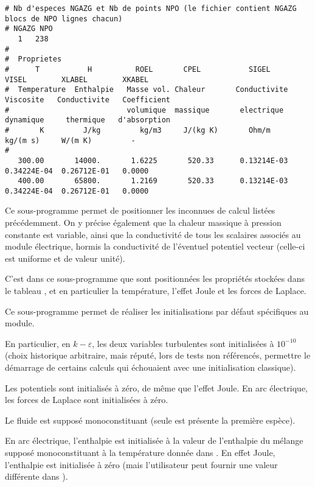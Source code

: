 {\scriptsize
\begin{verbatim}
# Nb d'especes NGAZG et Nb de points NPO (le fichier contient NGAZG blocs de NPO lignes chacun)
# NGAZG NPO
   1   238
#
#  Proprietes
#      T           H          ROEL       CPEL           SIGEL        VISEL        XLABEL        XKABEL
#  Temperature  Enthalpie   Masse vol. Chaleur       Conductivite  Viscosite   Conductivite   Coefficient
#                           volumique  massique       electrique   dynamique     thermique   d'absorption
#       K         J/kg         kg/m3     J/(kg K)       Ohm/m        kg/(m s)     W/(m K)         -
#
   300.00       14000.       1.6225       520.33      0.13214E-03  0.34224E-04  0.26712E-01   0.0000
   400.00       65800.       1.2169       520.33      0.13214E-03  0.34224E-04  0.26712E-01   0.0000
\end{verbatim}
}



Ce sous-programme permet de positionner les inconnues de calcul listées
précédemment. On y précise également que la chaleur massique à
pression constante est variable, ainsi que la conductivité de tous les
scalaires associés au module électrique, hormis la conductivité de
l'éventuel potentiel vecteur (celle-ci est uniforme et de valeur unité).



C'est dans ce sous-programme que sont positionnées les propriétés stockées
dans le tableau , et en particulier la température, l'effet Joule
et les forces de Laplace.


Ce sous-programme permet de réaliser les initialisations par défaut
spécifiques au module.

En particulier, en $k-\varepsilon$, les deux variables
turbulentes sont initialisées à $10^{-10}$ (choix historique arbitraire,
mais réputé, lors de tests non référencés, permettre le démarrage de
certains calculs qui échouaient avec une initialisation classique).

Les potentiels sont initialisés à zéro, de même que l'effet Joule. En
arc électrique, les forces de Laplace sont initialisées à zéro.

Le fluide est supposé monoconstituant (seule est présente la première
espèce).

En arc électrique, l'enthalpie est initialisée à la valeur de l'enthalpie du mélange
supposé monoconstituant à la température  donnée
dans .  En effet Joule, l'enthalpie est initialisée à zéro
(mais l'utilisateur peut fournir une valeur différente dans ).

